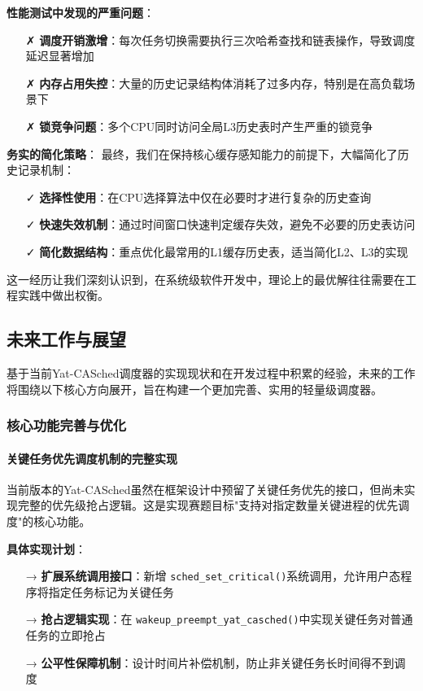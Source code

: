\textbf{性能测试中发现的严重问题}：
\begin{itemize}
    \item[✗] \textbf{调度开销激增}：每次任务切换需要执行三次哈希查找和链表操作，导致调度延迟显著增加
    \item[✗] \textbf{内存占用失控}：大量的历史记录结构体消耗了过多内存，特别是在高负载场景下
    \item[✗] \textbf{锁竞争问题}：多个CPU同时访问全局L3历史表时产生严重的锁竞争
\end{itemize}

\textbf{务实的简化策略}：
最终，我们在保持核心缓存感知能力的前提下，大幅简化了历史记录机制：
\begin{itemize}
    \item[✓] \textbf{选择性使用}：在CPU选择算法中仅在必要时才进行复杂的历史查询
    \item[✓] \textbf{快速失效机制}：通过时间窗口快速判定缓存失效，避免不必要的历史表访问
    \item[✓] \textbf{简化数据结构}：重点优化最常用的L1缓存历史表，适当简化L2、L3的实现
\end{itemize}

这一经历让我们深刻认识到，在系统级软件开发中，理论上的最优解往往需要在工程实践中做出权衡。

\subsection{未来工作与展望} \label{sec:future}

基于当前Yat-CASched调度器的实现现状和在开发过程中积累的经验，未来的工作将围绕以下核心方向展开，旨在构建一个更加完善、实用的轻量级调度器。

\subsubsection{核心功能完善与优化}

\paragraph{关键任务优先调度机制的完整实现}

当前版本的Yat-CASched虽然在框架设计中预留了关键任务优先的接口，但尚未实现完整的优先级抢占逻辑。这是实现赛题目标"支持对指定数量关键进程的优先调度"的核心功能。

\textbf{具体实现计划}：
\begin{itemize}
    \item[→] \textbf{扩展系统调用接口}：新增 \texttt{sched\_set\_critical()}系统调用，允许用户态程序将指定任务标记为关键任务
    \item[→] \textbf{抢占逻辑实现}：在 \texttt{wakeup\_preempt\_yat\_casched()}中实现关键任务对普通任务的立即抢占
    \item[→] \textbf{公平性保障机制}：设计时间片补偿机制，防止非关键任务长时间得不到调度
\end{itemize}

